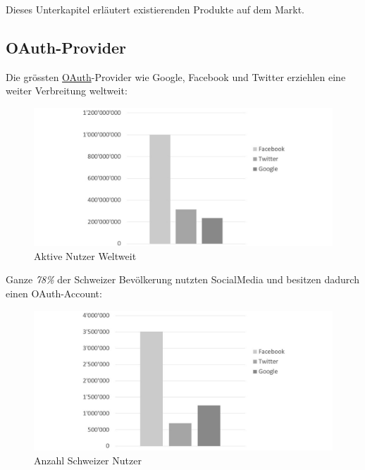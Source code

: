 Dieses Unterkapitel erläutert existierenden Produkte auf dem Markt.

\subsection{OAuth-Provider}\label{oauth-provider}

Die grössten \protect\hyperlink{oauth}{OAuth}-Provider wie Google,
Facebook und Twitter erziehlen eine weiter Verbreitung weltweit:

\begin{figure}[htbp]
\centering
\includegraphics{images/excel-statistik/socialmedia-aktivenutzer.jpg}
\caption[Aktive Nutzer Weltweit ]{Aktive Nutzer Weltweit
\footnotemark{}}
\end{figure}

Ganze \emph{78\%} \autocite{goldbachsocial} der Schweizer Bevölkerung
nutzten SocialMedia und besitzen dadurch einen OAuth-Account:

\begin{figure}[htbp]
\centering
\includegraphics{images/excel-statistik/socialmedia-schweiz.jpg}
\caption[Anzahl Schweizer Nutzer ]{Anzahl Schweizer Nutzer
\footnotemark{}}
\end{figure}

